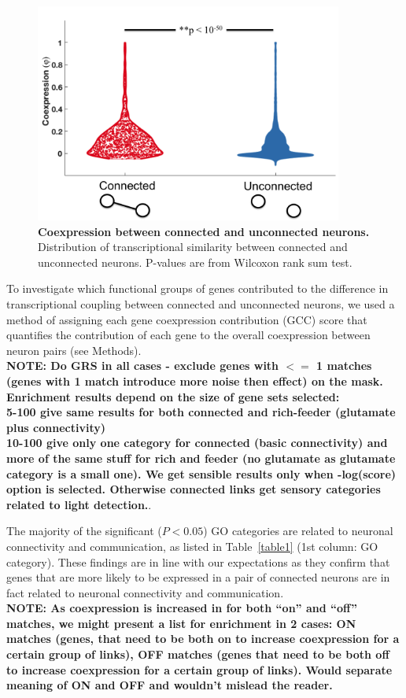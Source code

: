 \documentclass[10pt,letterpaper]{article}
\begin{document}
\begin{figure}[!h]
   \centering
    \includegraphics[width=0.9\textwidth]{ConUnconChemicalFINAL}
 \caption{{\bf Coexpression between connected and unconnected neurons.}
Distribution of transcriptional similarity between connected and unconnected neurons.
P-values are from Wilcoxon rank sum test.}
 \label{fig:ConUncon}
\end{figure}
To investigate which functional groups of genes contributed to the difference in transcriptional coupling between connected and unconnected neurons, we used a method of assigning each gene coexpression contribution (GCC) score that quantifies the contribution of each gene to the overall coexpression between neuron pairs (see Methods).  \\

\textbf{NOTE: Do GRS in all cases - exclude genes with $<=$ 1 matches (genes with 1 match introduce more noise then effect) on the mask.
Enrichment results depend on the size of gene sets selected: \\
5-100 give same results for both connected and rich-feeder (glutamate plus connectivity)\\
10-100 give only one category for connected (basic connectivity) and more of the same stuff for rich and feeder (no glutamate as glutamate category is a small one).
We get sensible results only when -log(score) option is selected.
Otherwise connected links get sensory categories related to light detection.}.

The majority of the significant ($P < 0.05$) GO categories are related to neuronal connectivity and communication, as listed in Table~\ref{table1} (1st column: GO category).
These findings are in line with our expectations as they confirm that genes that are more likely to be expressed in a pair of connected neurons are in fact related to neuronal connectivity and communication.\\
\textbf{NOTE: As coexpression is increased in for both ``on'' and ``off'' matches, we might present a list for enrichment in 2 cases: ON matches (genes, that need to be both on to increase coexpression for a certain group of links), OFF matches (genes that need to be both off to increase coexpression for a certain group of links).
Would separate meaning of ON and OFF and wouldn't mislead the reader. }
\end{document}
